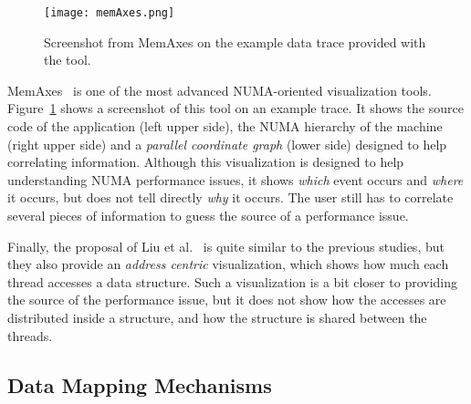 \begin{figure}[htb]
    \centering
    \texttt{[image: memAxes.png]}
    \caption{Screenshot from MemAxes on the example data trace provided with the
    tool.}
    \label{fig:memaxes}
\end{figure}

MemAxes~\cite{Gimenez14Dissecting} is one of the most advanced NUMA-oriented
visualization tools.
Figure~\ref{fig:memaxes} shows a screenshot of this tool on an example
trace. It shows the source code of the
application (left upper side), the NUMA hierarchy of the machine (right upper side)
and a \emph{parallel coordinate graph} (lower side) designed to help correlating information.
Although this visualization is designed to help understanding NUMA performance
issues, it shows \emph{which} event occurs and \emph{where} it occurs, but does not
tell directly \emph{why} it occurs. The user still has to correlate several pieces of
information to guess the source of a performance issue.

Finally, the proposal of Liu et al.~\cite{Liu14Tool} is quite similar to the previous studies, but
they also provide an \emph{address centric} visualization, which shows how
much each thread accesses a data structure. Such a visualization is a bit closer
to providing the source of the performance issue, but it does not show how the
accesses are distributed inside a structure, and how the structure is shared between
the threads.

\subsection{Data Mapping Mechanisms}
\label{sec:soa-mapping}

